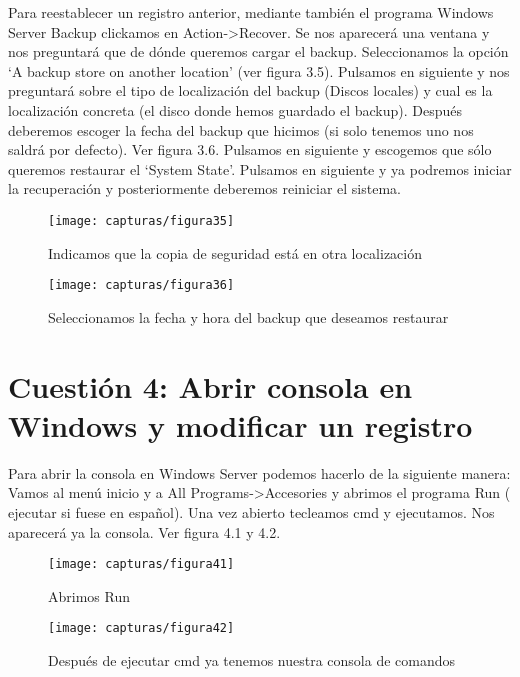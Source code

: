 	Para reestablecer un registro anterior, mediante también el programa Windows Server Backup clickamos en Action->Recover. Se nos aparecerá una ventana y nos preguntará que de dónde queremos cargar el backup. Seleccionamos la opción ‘A backup store on another location’ (ver figura 3.5). Pulsamos en siguiente y nos preguntará sobre el tipo de localización del backup (Discos locales) y cual es la localización concreta (el disco donde hemos guardado el backup). Después deberemos escoger la fecha del backup que hicimos (si solo tenemos uno nos saldrá por defecto). Ver figura 3.6. Pulsamos en siguiente y escogemos que sólo queremos restaurar el ‘System State’. Pulsamos en siguiente y ya podremos iniciar la recuperación y posteriormente deberemos reiniciar el sistema.
	
	\begin{figure} [H]
	\centering
	\texttt{[image: capturas/figura35]}
	\caption{Indicamos que la copia de seguridad está en otra localización}
	\label{fig:figura35}
	\end{figure}

	\begin{figure} [H]
	\centering
	\texttt{[image: capturas/figura36]}
	\caption{Seleccionamos la fecha y hora del backup que deseamos restaurar}
	\label{fig:figura36}
	\end{figure}

	\section{Cuestión 4: Abrir consola en Windows y modificar un registro}
	Para abrir la consola en Windows Server podemos hacerlo de la siguiente manera:
	\\
	
	Vamos al menú inicio y a All Programs->Accesories y abrimos el programa Run ( ejecutar si fuese en español). Una vez abierto tecleamos cmd y ejecutamos. Nos aparecerá ya la consola. Ver figura 4.1 y 4.2.
	\begin{figure} [H]
	\centering
	\texttt{[image: capturas/figura41]}
	\caption{Abrimos Run}
	\label{fig:figura41}
	\end{figure}
	
	\begin{figure} [H]
	\centering
	\texttt{[image: capturas/figura42]}
	\caption{Después de ejecutar cmd ya tenemos nuestra consola de comandos}
	\label{fig:figura42}
	\end{figure}
	
